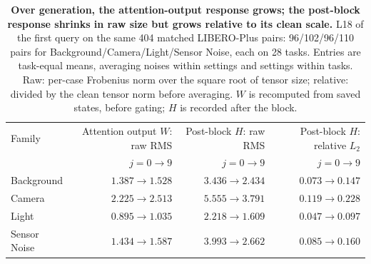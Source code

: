 \begin{table}[t]
\caption{\textbf{Over generation, the attention-output response grows; the post-block response shrinks in raw size but grows relative to its clean scale.} L18 of the first query on the same 404 matched LIBERO-Plus pairs: 96/102/96/110 pairs for Background/Camera/Light/Sensor Noise, each on 28 tasks. Entries are task-equal means, averaging noises within settings and settings within tasks. Raw: per-case Frobenius norm over the square root of tensor size; relative: divided by the clean tensor norm before averaging. $W$ is recomputed from saved states, before gating; $H$ is recorded after the block.}
\centering\small
\begin{tabular}{lrrr}\toprule
Family & Attention output $W$: raw RMS & Post-block $H$: raw RMS & Post-block $H$: relative $L_2$\\
 & $j=0\!\rightarrow9$ & $j=0\!\rightarrow9$ & $j=0\!\rightarrow9$\\\midrule
Background & $1.387\!\rightarrow1.528$ & $3.436\!\rightarrow2.434$ & $0.073\!\rightarrow0.147$\\
Camera & $2.225\!\rightarrow2.513$ & $5.555\!\rightarrow3.791$ & $0.119\!\rightarrow0.228$\\
Light & $0.895\!\rightarrow1.035$ & $2.218\!\rightarrow1.609$ & $0.047\!\rightarrow0.097$\\
Sensor Noise & $1.434\!\rightarrow1.587$ & $3.993\!\rightarrow2.662$ & $0.085\!\rightarrow0.160$\\
\bottomrule\end{tabular}

\label{tab:attention-generation-sites}
\end{table}
